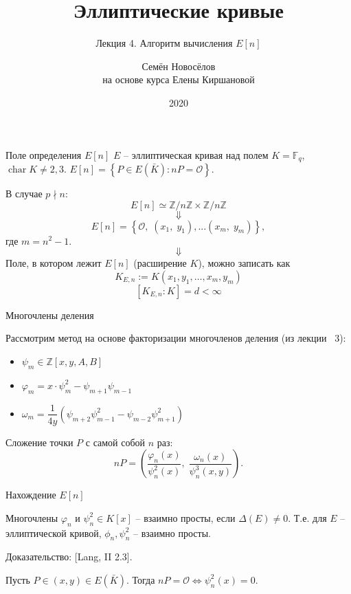 \documentclass{beamer}
\title{Эллиптические кривые}
\subtitle{Лекция 4. Алгоритм вычисления $E[n]$}
\author{Семён Новосёлов\\
\footnotesize{на основе курса Елены Киршановой}}
\institute{БФУ им. И. Канта}
\date{2020}
\begin{document}
\frame{\titlepage}

\begin{frame}{Поле определения $E[n]$}
$E$ -- эллиптическая кривая над полем $K = \mathbb{F}_q$, $\operatorname{char}{K} \ne 2,3$.
     $E[n] = \left\{ {P \in E\left( \bar{K} \right) : nP = \mathcal{O}} \right\}$.

    В случае $p \nmid n$:
    \[
    E\left[ n \right] \simeq \mathbb{Z}/n\mathbb{Z} \times \mathbb{Z}/n\mathbb{Z}
    \]
    \[\Downarrow\]
    \[
    E\left[n\right] = \left\{ {\mathcal{O},\;\left( {{x_1},\;{y_1}} \right), ... \left( {{x_m},\;{y_m}} \right)} \right\},
    \]
    где $m=n^2-1$.
    \[\Downarrow\]
    Поле, в котором лежит $E\left[ n \right]$ (расширение
    $K$), можно записать как
    \[
    K_{E,n} := K\left( {{x_1}, {y_1}, \ldots, x_m, y_m} \right)
    \]
    \[
    \left[ K_{E,n} : K \right] = d < \infty 
    \]
\end{frame}

\begin{frame}{Многочлены деления}
    
    Рассмотрим метод на основе факторизации многочленов деления (из лекции \textnumero~$3$):
    
    \begin{itemize}
        \item $\psi_m \in \mathbb{Z}\left[x,y,A,B\right]$
        \item $\varphi_m = x \cdot \psi_m^2 - \psi_{m + 1} \psi_{m - 1}$
        
        \item $\omega_m = \dfrac{1}{{4y}}\left( {{\psi_{m + 2}}\psi_{m - 1}^2 - {\psi_{m - 2}}\psi_{m + 1}^2} \right)$
    \end{itemize}
    Сложение точки $P$ с самой собой $n$ раз:
    \begin{equation*}
        nP = \left( {\frac{{{\varphi _n}(x)}}{{\psi _n^2(x)}},\;\frac{{{\omega _n}( x )}}{{\psi _n^3(x,y)}}} \right).
    \end{equation*}
\end{frame}

\begin{frame}{Нахождение $E[n]$}
\begin{lemma}
Многочлены ${\varphi _n}$ и $\psi _n^2 \in K\left[ x \right]$ -- взаимно просты, если $\Delta (E) \ne 0$. Т.е. для $E$ -- эллиптической кривой, ${\phi _n}, \psi _n^2$ -- взаимно просты.
\end{lemma}
\structure{$\triangleleft$} Доказательство: [Lang, II 2.3].\structure{$\triangleright$}

\begin{corollary}
Пусть $P \in ( {x,y}) \in E(\bar{K})$. Тогда $n P = \mathcal{O} \Leftrightarrow \psi_n^2(x) = 0$.
\end{corollary}
\end{frame}
\end{document}
